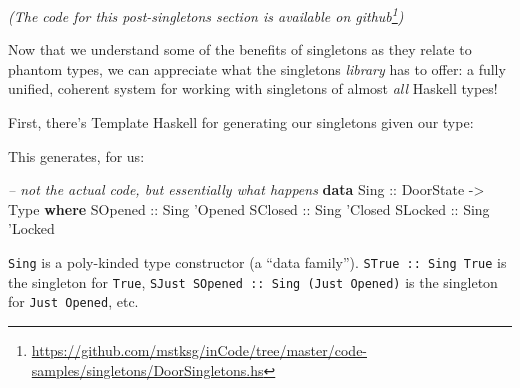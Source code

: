 \documentclass[]{article}
\newenvironment{Shaded}{}{}
\newcommand{\CommentTok}[1]{\textcolor[rgb]{0.38,0.63,0.69}{\textit{#1}}}
\newcommand{\DataTypeTok}[1]{\textcolor[rgb]{0.56,0.13,0.00}{#1}}
\newcommand{\FunctionTok}[1]{\textcolor[rgb]{0.02,0.16,0.49}{#1}}
\newcommand{\KeywordTok}[1]{\textcolor[rgb]{0.00,0.44,0.13}{\textbf{#1}}}
\newcommand{\NormalTok}[1]{#1}
\newcommand{\OtherTok}[1]{\textcolor[rgb]{0.00,0.44,0.13}{#1}}
\renewcommand{\href}[2]{#2\footnote{\url{#1}}}
\begin{document}
\emph{(The code for this post-singletons section is available
\href{https://github.com/mstksg/inCode/tree/master/code-samples/singletons/DoorSingletons.hs}{on
github})}

Now that we understand some of the benefits of singletons as they relate to
phantom types, we can appreciate what the singletons \emph{library} has to
offer: a fully unified, coherent system for working with singletons of almost
\emph{all} Haskell types!

First, there's Template Haskell for generating our singletons given our type:

\begin{Shaded}
\end{Shaded}

This generates, for us:

\begin{Shaded}
\begin{Highlighting}[]
\CommentTok{-- not the actual code, but essentially what happens}
\KeywordTok{data} \DataTypeTok{Sing}\OtherTok{ ::} \DataTypeTok{DoorState} \OtherTok{->} \DataTypeTok{Type} \KeywordTok{where}
    \DataTypeTok{SOpened}\OtherTok{ ::} \DataTypeTok{Sing}\NormalTok{ '}\DataTypeTok{Opened}
    \DataTypeTok{SClosed}\OtherTok{ ::} \DataTypeTok{Sing}\NormalTok{ '}\DataTypeTok{Closed}
    \DataTypeTok{SLocked}\OtherTok{ ::} \DataTypeTok{Sing}\NormalTok{ '}\DataTypeTok{Locked}
\end{Highlighting}
\end{Shaded}

\texttt{Sing} is a poly-kinded type constructor (a ``data family'').
\texttt{STrue\ ::\ Sing\ \textquotesingle{}True} is the singleton for
\texttt{\textquotesingle{}True},
\texttt{SJust\ SOpened\ ::\ Sing\ (\textquotesingle{}Just\ \textquotesingle{}Opened)}
is the singleton for \texttt{\textquotesingle{}Just\ \textquotesingle{}Opened},
etc.
\end{document}
